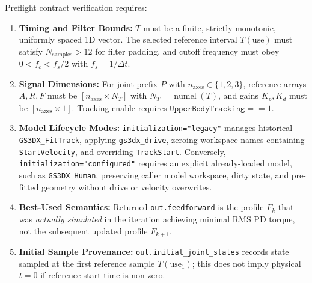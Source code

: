 \documentclass[11pt,a4paper]{article}
\begin{document}
Preflight contract verification requires:
\begin{enumerate}
  \item \textbf{Timing and Filter Bounds:} $T$ must be a finite, strictly monotonic, uniformly spaced 1D vector. The selected reference interval $T(\mathrm{use})$ must satisfy $N_{\mathrm{samples}} > 12$ for filter padding, and cutoff frequency must obey $0 < f_c < f_s / 2$ with $f_s = 1/\Delta t$.
  \item \textbf{Signal Dimensions:} For joint prefix $P$ with $n_{\mathrm{axes}} \in \{1, 2, 3\}$, reference arrays $A, R, F$ must be $[n_{\mathrm{axes}} \times N_T]$ with $N_T=\operatorname{numel}(T)$, and gains $K_p, K_d$ must be $[n_{\mathrm{axes}} \times 1]$. Tracking enable requires $\mathtt{UpperBodyTracking} == 1$.
  \item \textbf{Model Lifecycle Modes:} \texttt{initialization="legacy"} manages historical \texttt{GS3DX\_FitTrack}, applying \texttt{gs3dx\_drive}, zeroing workspace names containing \texttt{StartVelocity}, and overriding \texttt{TrackStart}. Conversely, \texttt{initialization="configured"} requires an explicit already-loaded model, such as \texttt{GS3DX\_Human}, preserving caller model workspace, dirty state, and pre-fitted geometry without drive or velocity overwrites.
  \item \textbf{Best-Used Semantics:} Returned \texttt{out.feedforward} is the profile $F_k$ that was \emph{actually simulated} in the iteration achieving minimal RMS PD torque, not the subsequent updated profile $F_{k+1}$.
  \item \textbf{Initial Sample Provenance:} \texttt{out.initial\_joint\_states} records state sampled at the first reference sample $T(\mathrm{use}_1)$; this does not imply physical $t=0$ if reference start time is non-zero.
\end{enumerate}
\end{document}

